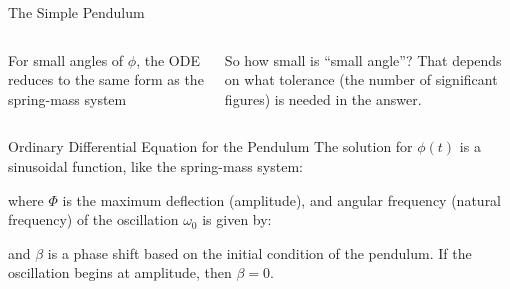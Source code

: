 \documentclass[12pt,compress,aspectratio=169]{beamer}
\begin{document}
\begin{frame}{The Simple Pendulum}
  \begin{columns}
    For small angles of $\phi$, the ODE reduces to the same form as the
    spring-mass system


    So how small is ``small angle''? That depends on what tolerance (the
    number of significant figures) is needed in the answer.
    
    \centering
  \end{columns}
\end{frame}



\begin{frame}{Ordinary Differential Equation for the Pendulum}
  The solution for $\phi(t)$ is a sinusoidal function, like the spring-mass
  system:


    where $\Phi$ is the maximum deflection (amplitude), and angular
    frequency (natural frequency) of the oscillation $\omega_0$ is given by:
    

    and $\beta$ is a phase shift based on the initial condition of the pendulum.
    If the oscillation begins at amplitude, then $\beta=0$.
\end{frame}
\end{document}
